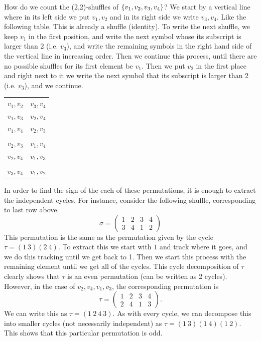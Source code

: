 \begin{observation}
	How do we count the (2,2)-shuffles of $ \{v_1,v_2,v_3,v_4\} $? We start by a vertical line where in its left side we put $ v_1,v_2 $ and in its right side we write $ v_3,v_4 $. Like the following table. This is already a shuffle (identity). To write the next shuffle, we keep $ v_1 $ in the first position, and write the next symbol whose its subscript is larger than 2 (i.e. $ v_3 $), and write the remaining symbols in the right hand side of the vertical line in increasing order. Then we continue this process, until there are no possible shuffles for its first element be $ v_1 $. Then we put $ v_2 $ in the first place and right next to it we write the next symbol that its subscript is larger than 2 (i.e. $ v_3 $), and we continue.

	\begin{center}
		\begin{tabular}{c|c}
			$ v_1,v_2 $ & $ v_3,v_4 $  \\
			$ v_1,v_3 $ & $ v_2,v_4 $ \\
			$ v_1,v_4 $ & $ v_2,v_3 $ \\
			& \\
			$ v_2,v_3 $ & $ v_1,v_4 $ \\
			$ v_2,v_4 $ & $ v_1,v_3 $ \\
			& \\
			$ v_3,v_4 $ & $ v_1,v_2 $ \\
		\end{tabular}
	\end{center}
	
	In order to find the sign of the each of these permutations, it is enough to extract the independent cycles. For instance, consider the following shuffle, corresponding to last row above.
	\[ \sigma = \begin{pmatrix}
		1 & 2 & 3 & 4 \\
		3 & 4 & 1 & 2
	\end{pmatrix}  \]
	This permutation is the same as the permutation given by the cycle $ \tau = (1\ 3)(2\ 4) $. To extract this we start with $ 1 $ and track where it goes, and we do this tracking until we get back to 1. Then we start this process with the remaining element until we get all of the cycles. This cycle decomposition of $ \tau $ clearly shows that $  \tau $ is an even permutation (can be written as 2 cycles). However, in the case of $ v_2,v_4,v_1,v_3 $, the corresponding permutation is 
	\[ \tau = 
	\begin{pmatrix}
		1 & 2 & 3 & 4 \\
		2 & 4 & 1 & 3
	\end{pmatrix}.
	 \]
	 We can write this as $ \tau = (1\ 2\ 4\ 3) $. As with every cycle, we can decompose this into smaller cycles (not necessarily independent) as $ \tau = (1\ 3)(1\ 4)(1\ 2) $. This shows that this particular permutation is odd.
	
\end{observation}


